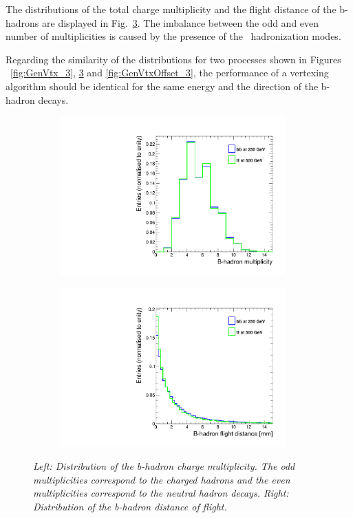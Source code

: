The distributions of the total charge multiplicity and the flight distance of the b-hadrons are displayed in Fig.~\ref{fig:GenHadronParams_3}.
The imbalance between the odd and even number of multiplicities is caused by the presence of the \Bzs\ hadronization modes.

Regarding the similarity of the distributions for two processes shown in Figures ~\ref{fig:GenVtx_3}, \ref{fig:GenHadronParams_3} and \ref{fig:GenVtxOffset_3}, the performance of a vertexing algorithm should be identical for the same energy and the direction of the b-hadron decays.


\begin{figure}[h]
\centering
\begin{subfigure}{0.5\textwidth}
    \includegraphics[width=0.95\textwidth]{ILD/plots/gen-hadron-multiplicity.pdf}
\caption{\label{fig:GenHadronParams_a_3} }
\end{subfigure}%
  \begin{subfigure}{0.5\textwidth}
\centering
    \includegraphics[width=0.95\textwidth]{ILD/plots/gen-hadron-distance.pdf}
\caption{\label{fig:GenHadronParams_b_3} }
\end{subfigure}
    \caption{\sl Left: Distribution of the b-hadron charge multiplicity. The odd multiplicities correspond to the charged hadrons and the even multiplicities correspond to the neutral hadron decays.   Right: Distribution of the b-hadron distance of flight. }
    \label{fig:GenHadronParams_3}
\end{figure}

